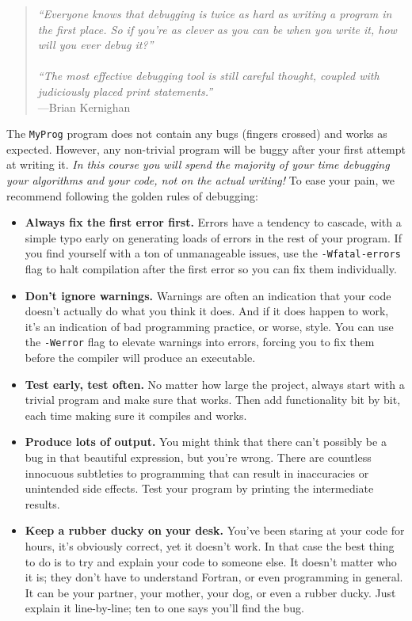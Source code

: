 \label{chap:Debugging}

\begin{quote}\small
  \emph{``Everyone knows that debugging is twice as hard as writing a program in the first place.
  So if you're as clever as you can be when you write it, how will you ever debug it?'' \\ \\
  ``The most effective debugging tool is still careful thought, coupled with judiciously placed print statements.''} \\\hspace*{\fill}---Brian Kernighan
\end{quote}
The \texttt{MyProg} program does not contain any bugs (fingers crossed) and works as expected.
However, any non-trivial program will be buggy after your first attempt at writing it.
\emph{In this course you will spend the majority of your time debugging your algorithms and your code, not on the actual writing!} To ease your pain, we recommend following the golden rules of debugging:
\begin{itemize}
  \item\textbf{Always fix the first error first.} Errors have a tendency to cascade, with a simple typo early on generating loads of errors in the rest of your program.
    If you find yourself with a ton of unmanageable issues, use the \texttt{-Wfatal-errors} flag to halt compilation after the first error so you can fix them individually.
  \item\textbf{Don't ignore warnings.} Warnings are often an indication that your code doesn't actually do what you think it does.
    And if it does happen to work, it's an indication of bad programming practice, or worse, style.
    You can use the \texttt{-Werror} flag to elevate warnings into errors, forcing you to fix them before the compiler will produce an executable.
  \item\textbf{Test early, test often.} No matter how large the project, always start with a trivial program and make sure that works.
    Then add functionality bit by bit, each time making sure it compiles and works.
  \item\textbf{Produce lots of output.} You might think that there can't possibly be a bug in that beautiful expression, but you're wrong.
    There are countless innocuous subtleties to programming that can result in inaccuracies or unintended side effects.
    Test your program by printing the intermediate results.
  \item\textbf{Keep a rubber ducky on your desk.} You've been staring at your code for hours, it's obviously correct, yet it doesn't work.
    In that case the best thing to do is to try and explain your code to someone else.
    It doesn't matter who it is; they don't have to understand Fortran, or even programming in general.
    It can be your partner, your mother, your dog, or even a rubber ducky.
    Just explain it line-by-line; ten to one says you'll find the bug.
\end{itemize}
